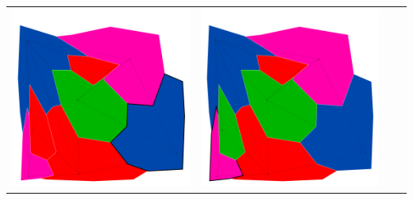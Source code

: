 \documentclass[10pt,a4paper]{article}
\begin{document}
\begin{tabular}{c c c c }
	\includegraphics[scale=.10]{../results/genetic/map_build/genetic_I00005.pdf}&
	\includegraphics[scale=.10]{../results/genetic/map_build/genetic_I00006.pdf}\\
\end{tabular}

	
	
\end{document}
